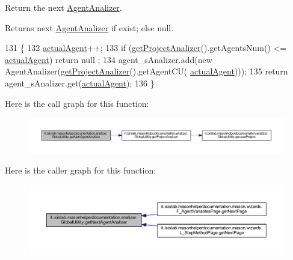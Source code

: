 Return the next \hyperlink{classit_1_1isislab_1_1masonhelperdocumentation_1_1analizer_1_1_agent_analizer}{Agent\-Analizer}. \begin{DoxyReturn}{Returns}
next \hyperlink{classit_1_1isislab_1_1masonhelperdocumentation_1_1analizer_1_1_agent_analizer}{Agent\-Analizer} if exist; else null. 
\end{DoxyReturn}

\begin{DoxyCode}
131                                                       \{
132         \hyperlink{classit_1_1isislab_1_1masonhelperdocumentation_1_1analizer_1_1_global_utility_a8106b6699b9c7834ead4fc38d62a2575}{actualAgent}++;
133         \textcolor{keywordflow}{if} (\hyperlink{classit_1_1isislab_1_1masonhelperdocumentation_1_1analizer_1_1_global_utility_af6bcca0c06ec6fa8c2b2b88f5050914c}{getProjectAnalizer}().getAgentsNum() <= \hyperlink{classit_1_1isislab_1_1masonhelperdocumentation_1_1analizer_1_1_global_utility_a8106b6699b9c7834ead4fc38d62a2575}{actualAgent})    \textcolor{keywordflow}{return} null
      ;
134         agent\_sAnalizer.add(\textcolor{keyword}{new} AgentAnalizer(\hyperlink{classit_1_1isislab_1_1masonhelperdocumentation_1_1analizer_1_1_global_utility_af6bcca0c06ec6fa8c2b2b88f5050914c}{getProjectAnalizer}().getAgentCU(
      \hyperlink{classit_1_1isislab_1_1masonhelperdocumentation_1_1analizer_1_1_global_utility_a8106b6699b9c7834ead4fc38d62a2575}{actualAgent})));
135         \textcolor{keywordflow}{return} agent\_sAnalizer.get(\hyperlink{classit_1_1isislab_1_1masonhelperdocumentation_1_1analizer_1_1_global_utility_a8106b6699b9c7834ead4fc38d62a2575}{actualAgent});     
136     \}
\end{DoxyCode}


Here is the call graph for this function\-:
\nopagebreak
\begin{figure}[H]
\begin{center}
\leavevmode
\includegraphics[width=350pt]{classit_1_1isislab_1_1masonhelperdocumentation_1_1analizer_1_1_global_utility_a918557388574cea36be74712ff768d0a_cgraph}
\end{center}
\end{figure}




Here is the caller graph for this function\-:
\nopagebreak
\begin{figure}[H]
\begin{center}
\leavevmode
\includegraphics[width=350pt]{classit_1_1isislab_1_1masonhelperdocumentation_1_1analizer_1_1_global_utility_a918557388574cea36be74712ff768d0a_icgraph}
\end{center}
\end{figure}



